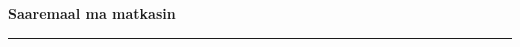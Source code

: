 \documentclass[10pt]{book}
\begin{document}
{
  \samepage
  \raggedbottom
  \raggedright
  \sloppy


  \vspace{0.2in}

  \noindent\begin{minipage}{.1\textwidth}
    \hfill\vspace{0.1in}
  \end{minipage}%
  \noindent\begin{minipage}{.8\textwidth}
    \centering
    \bfseries
    \large Saaremaal ma matkasin
  \end{minipage}%
  \noindent\begin{minipage}{.1\textwidth}
      \hfill\vspace{0.1in}
  \end{minipage}

  \nopagebreak[4]
  \vspace{0.1in}
  \nopagebreak[4]
  \hrule height 0.05ex
  \nopagebreak[4]
  \vspace{-0.05in}




}
\end{document}
